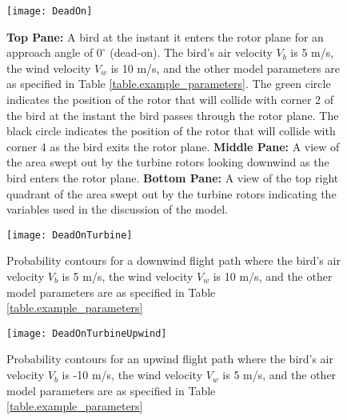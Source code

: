 \label{} \documentclass[10pt,conference]{IEEEtran}
\begin{document}
\begin{figure}[h!]
   \centering
   \texttt{[image: DeadOn]}
   \caption{\textbf{Top Pane:} A bird at the instant it enters the rotor plane for an approach angle of $0^\circ$ (dead-on). The bird's air velocity $V_b$ is 5
m/s, the wind velocity $V_w$ is 10 m/s, and the other model parameters are as specified in Table
\ref{table.example_parameters}. The green circle indicates the position of the rotor that will collide with corner 2 of
the bird at the instant the bird passes through the rotor plane. The black circle indicates the position of the rotor
that will collide with corner 4 as the bird exits the rotor plane. \textbf{Middle Pane:} A view of the area swept out
by the turbine rotors looking downwind as the bird enters the rotor plane. \textbf{Bottom Pane:} A view of the top
right quadrant of the area swept out by the turbine rotors indicating the variables used in the discussion of the
model.}
   \label{fig.DeadOn}
   \end{figure}

\begin{figure}
   \centering
   \texttt{[image: DeadOnTurbine]}
   \caption{Probability contours for a downwind flight path where the bird's air velocity $V_b$ is 5
m/s, the wind velocity $V_w$ is 10 m/s, and the other model parameters are as specified in Table
\ref{table.example_parameters}}
   \label{fig.DeadOnTurbine}
   \end{figure}

\begin{figure}
   \centering
   \texttt{[image: DeadOnTurbineUpwind]}
   \caption{Probability contours for an upwind flight path where the bird's air velocity $V_b$ is -10
m/s, the wind velocity $V_w$ is 5 m/s, and the other model parameters are as specified in Table
\ref{table.example_parameters}}
   \label{fig.DeadOnTurbineUpwind}
   \end{figure}
\end{document}
